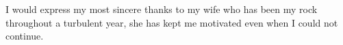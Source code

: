 I would express my most sincere thanks to my wife who has been my rock throughout a turbulent year, she has kept me motivated even when I could not continue.